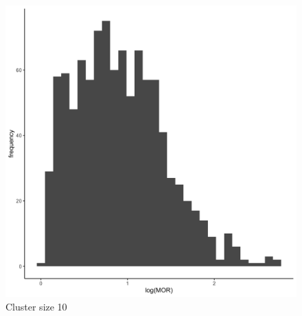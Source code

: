 \documentclass[
  letterpaper,
  DIV=11,
  numbers=noendperiod,
  titlepage]{scrartcl}
\begin{document}
\begin{figure}
\begin{minipage}[t]{0.24\linewidth}
{{\includegraphics{../../plots/two-lvl-ran-slope/high-prev/hist_10_10_two_lvl_slp_high_prev_q2.png}

}

\caption{Cluster size 10}

}

\end{minipage}%
%
\begin{minipage}[t]{0.24\linewidth}

{\centering 

}
\end{minipage}
\end{figure}
\end{document}

